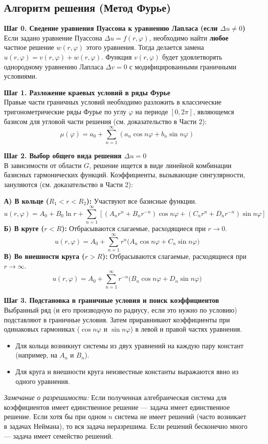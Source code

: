 \documentclass[a4paper,10pt]{article}
\begin{document}
\subsection*{Алгоритм решения (Метод Фурье)}

\textbf{Шаг 0. Сведение уравнения Пуассона к уравнению Лапласа (если $\Delta u \neq 0$)} \\
Если задано уравнение Пуассона $\Delta u = f(r, \varphi)$, необходимо найти \textbf{любое} частное решение $w(r, \varphi)$ этого уравнения. Тогда делается замена $u(r, \varphi) = v(r, \varphi) + w(r, \varphi)$.
Функция $v(r, \varphi)$ будет удовлетворять однородному уравнению Лапласа $\Delta v = 0$ с модифицированными граничными условиями.

\textbf{Шаг 1. Разложение краевых условий в ряды Фурье} \\
Правые части граничных условий необходимо разложить в классические тригонометрические ряды Фурье по углу $\varphi$ на периоде $[0, 2\pi]$, являющемся базисом для угловой части решения (см. доказательство в Части 2):
\[ \mu(\varphi) = a_0 + \sum_{n=1}^\infty \left( a_n \cos n\varphi + b_n \sin n\varphi \right) \]

\textbf{Шаг 2. Выбор общего вида решения $\Delta u = 0$} \\
В зависимости от области $G$, решение ищется в виде линейной комбинации базисных гармонических функций. Коэффициенты, вызывающие сингулярности, зануляются (см. доказательство в Части 2):

\noindent
\textbf{А) В кольце ($R_1 < r < R_2$):} Участвуют все базисные функции.
\[ u(r, \varphi) = A_0 + B_0 \ln r + \sum_{n=1}^\infty \left[ \left( A_n r^n + B_n r^{-n} \right) \cos n\varphi + \left( C_n r^n + D_n r^{-n} \right) \sin n\varphi \right] \]
\textbf{Б) В круге ($r < R$):} Отбрасываются слагаемые, расходящиеся при $r \to 0$.
\[ u(r, \varphi) = A_0 + \sum_{n=1}^\infty r^n \big( A_n \cos n\varphi + C_n \sin n\varphi \big) \]
\textbf{В) Во внешности круга ($r > R$):} Отбрасываются слагаемые, расходящиеся при $r \to \infty$.
\[ u(r, \varphi) = A_0 + \sum_{n=1}^\infty r^{-n} \big( B_n \cos n\varphi + D_n \sin n\varphi \big) \]

\textbf{Шаг 3. Подстановка в граничные условия и поиск коэффициентов} \\
Выбранный ряд (и его производную по радиусу, если это нужно по условию) подставляют в граничные условия. Затем приравнивают коэффициенты при одинаковых гармониках ($\cos n\varphi$ и $\sin n\varphi$) в левой и правой частях уравнения.
\begin{itemize}
    \item Для кольца возникнут системы из двух уравнений на каждую пару констант (например, на $A_n$ и $B_n$).
    \item Для круга и внешности круга неизвестные константы выражаются явно из одного уравнения.
\end{itemize}
\textit{Замечание о разрешимости:} Если полученная алгебраическая система для коэффициентов имеет единственное решение — задача имеет единственное решение. Если хотя бы при одном $n$ система не имеет решений (часто возникает в задачах Неймана), то вся задача неразрешима. Если решений бесконечно много — задача имеет семейство решений.
\end{document}
